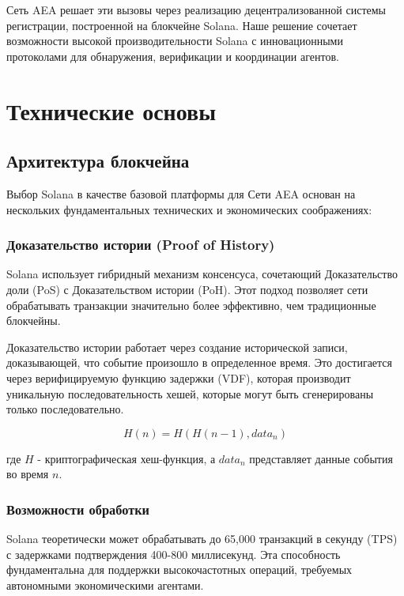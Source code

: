 \documentclass[12pt,a4paper]{article}
\begin{document}
Сеть AEA решает эти вызовы через реализацию децентрализованной системы регистрации, построенной на блокчейне Solana. Наше решение сочетает возможности высокой производительности Solana с инновационными протоколами для обнаружения, верификации и координации агентов.

\section{Технические основы}

\subsection{Архитектура блокчейна}

Выбор Solana в качестве базовой платформы для Сети AEA основан на нескольких фундаментальных технических и экономических соображениях:

\subsubsection{Доказательство истории (Proof of History)}

Solana использует гибридный механизм консенсуса, сочетающий Доказательство доли (PoS) с Доказательством истории (PoH). Этот подход позволяет сети обрабатывать транзакции значительно более эффективно, чем традиционные блокчейны.

Доказательство истории работает через создание исторической записи, доказывающей, что событие произошло в определенное время. Это достигается через верифицируемую функцию задержки (VDF), которая производит уникальную последовательность хешей, которые могут быть сгенерированы только последовательно.

\begin{equation}
H(n) = H(H(n-1), data_n)
\end{equation}

где $H$ - криптографическая хеш-функция, а $data_n$ представляет данные события во время $n$.

\subsubsection{Возможности обработки}

Solana теоретически может обрабатывать до 65,000 транзакций в секунду (TPS) с задержками подтверждения 400-800 миллисекунд. Эта способность фундаментальна для поддержки высокочастотных операций, требуемых автономными экономическими агентами.
\end{document}
